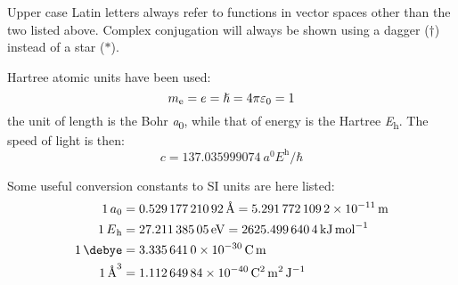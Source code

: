 Upper case Latin letters always refer to functions in vector spaces
other than the two listed above. Complex conjugation will always be
shown using a dagger ($\dagger$) instead of a star ($*$).

Hartree atomic units have been used:~\autocite{Whiffen1978-xx}
\begin{equation*}
 \si{\electronmass} = \si{\elementarycharge} = \hslash = 4\pi\diel_0 = 1
\end{equation*}
the unit of length is the Bohr \si{\bohr}, while that of energy is the Hartree \si{\hartree}.
The speed of light is then:
\begin{equation*}
 c = \SI{137.035999074}{\bohr\hartree\per\planckbar}
\end{equation*}

Some useful conversion constants to SI units are here
listed:~\autocite{Mohr2012-zc}
\begin{subequations}
 \begin{align*}
  \SI{1}{\bohr} &= \SI{0.52917721092}{\angstrom} = \SI{5.2917721092e-11}{\meter} \\
  \SI{1}{\hartree} &= \SI{27.21138505}{\electronvolt} = \SI{2625.4996404}{\kilo\joule\per\mole} \\
  \SI{1}{\debye} &= \SI{3.3356410E-30}{\coulomb\meter} \\
  \SI{1}{\angstrom\cubed} &= \SI{1.11264984E-40}{\coulomb\squared\meter\squared\per\joule}
 \end{align*}
\end{subequations}
